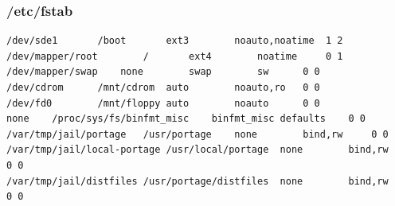 \documentclass[11pt]{article}
\begin{document}
\subsubsection{/etc/fstab}
\label{sec:org78e1dcb}
\begin{verbatim}
/dev/sde1       /boot       ext3        noauto,noatime  1 2
/dev/mapper/root        /       ext4        noatime     0 1
/dev/mapper/swap    none        swap        sw      0 0
/dev/cdrom      /mnt/cdrom  auto        noauto,ro   0 0
/dev/fd0        /mnt/floppy auto        noauto      0 0
none    /proc/sys/fs/binfmt_misc    binfmt_misc defaults    0 0
/var/tmp/jail/portage   /usr/portage    none        bind,rw     0 0
/var/tmp/jail/local-portage /usr/local/portage  none        bind,rw     0 0
/var/tmp/jail/distfiles /usr/portage/distfiles  none        bind,rw     0 0
\end{verbatim}
\end{document}
